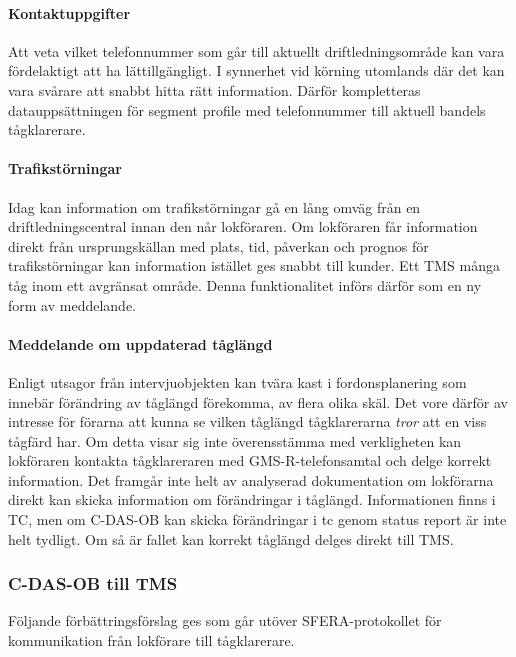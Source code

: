 \paragraph{Kontaktuppgifter}
Att veta vilket telefonnummer som går till aktuellt driftledningsområde kan vara fördelaktigt att ha lättillgängligt.
I synnerhet vid körning utomlands där det kan vara svårare att snabbt hitta rätt information.
Därför kompletteras datauppsättningen för segment profile med telefonnummer till aktuell bandels tågklarerare.
\paragraph{Trafikstörningar}
Idag kan information om trafikstörningar gå en lång omväg från en driftledningscentral innan den når lokföraren.
Om lokföraren får information direkt från ursprungskällan med plats, tid, påverkan och prognos för trafikstörningar kan information istället ges snabbt till kunder.
Ett TMS många tåg inom ett avgränsat område.
Denna funktionalitet införs därför som en ny form av meddelande.
\paragraph{Meddelande om uppdaterad tåglängd}
Enligt utsagor från intervjuobjekten kan tvära kast i fordonsplanering som innebär förändring av tåglängd förekomma, av flera olika skäl.
Det vore därför av intresse för förarna att kunna se vilken tåglängd tågklarerarna \emph{tror} att en viss tågfärd har.
Om detta visar sig inte överensstämma med verkligheten kan lokföraren kontakta tågklareraren med GMS-R-telefonsamtal och delge korrekt information.
Det framgår inte helt av analyserad dokumentation om lokförarna direkt kan skicka information om förändringar i tåglängd.
Informationen finns i TC, men om C-DAS-OB kan skicka förändringar i tc genom status report är inte helt tydligt.
Om så är fallet kan korrekt tåglängd delges direkt till TMS\@.
\subsubsection{C-DAS-OB till TMS}
Följande förbättringsförslag ges som går utöver SFERA-protokollet för kommunikation från lokförare till tågklarerare.
